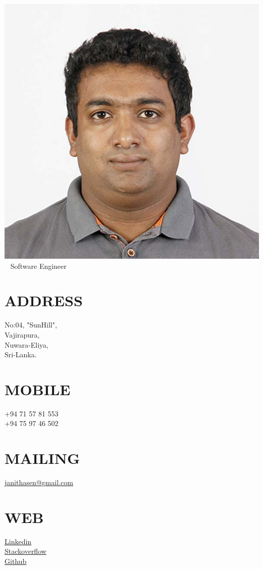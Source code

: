 \documentclass[]{cv-class}
\begin{document}
\begin{aside}
\color{blue}
  \includegraphics[scale=0.9]{img/photo.jpg}
    ~
      {Software Engineer}
   ~
  \section{ADDRESS}
    {\whitebodyfont No:04, "SunHill",\\
    Vajirapura,\\
    Nuwara-Eliya,\\
    Sri-Lanka.}
    ~
  \section{MOBILE}
    {\whitebodyfont +94 71 57 81 553\\
    +94 75 97 46 502}
    ~
  \section{MAILING}
    \underline{\href{mailto:janithasen@gmail.com}{{\whitebodyfont janithasen@gmail.com}}}
    ~
  \section{WEB}
  	\vspace{0.10cm}
    \underline{\href{https://www.linkedin.com/in/janithamadushan}{{\whitebodyfont Linkedin}}}
    \\
	\vspace{0.10cm}
    \underline{\href{https://stackoverflow.com/story/jmadushan}{{\whitebodyfont Stackoverflow}}}
	\\	
	\vspace{0.10cm}
    \underline{\href{https://github.com/janitham}{{\whitebodyfont Github}}}
    ~

\end{aside}
\end{document}
